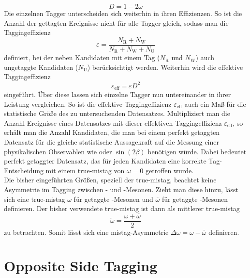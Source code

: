 \begin{equation}
D=1-2\omega
\end{equation}
Die einzelnen Tagger unterscheiden sich weiterhin in ihren Effizienzen. So ist die Anzahl der gettagten Ereignisse nicht für alle Tagger gleich, sodass  man die Taggingeffizienz
\begin{equation}
\varepsilon=\frac{N_{\text{R}}+N_{\text{W}}}{N_{\text{R}}+N_{\text{W}}+N_{\text{U}}}
\end{equation}
definiert, bei der neben Kandidaten mit einem Tag ($N_\text{R}$ und $N_\text{W}$) auch ungetaggte Kandidaten ($N_\text{U}$) berücksichtigt werden. Weiterhin wird die effektive Taggingeffizienz
\begin{equation}
\varepsilon_\text{eff}=\varepsilon D^2
\end{equation}
eingeführt. Über diese lassen sich einzelne Tagger nun untereinander in ihrer Leistung vergleichen. So ist die effektive Taggingeffizienz $\varepsilon_\text{eff}$ auch ein Maß für die statistische Größe des zu untersuchenden Datensatzes. Multipliziert man die Anzahl Ereignisse eines Datensatzes mit dieser effektiven Taggingeffizienz $\varepsilon_\text{eff}$, so erhält man die Anzahl Kandidaten, die man bei einem perfekt getaggten Datensatz für die gleiche statistische Aussagekraft auf die Messung einer physikalischen Observablen wie \dmd oder $\sin\left(2\beta\right)$ benötigen würde. Dabei bedeutet perfekt getaggter Datensatz, das für jeden Kandidaten eine korrekte Tag-Entscheidung mit einem true-mistag von $\omega=0$ getroffen wurde.\\
Die bisher eingeführten Größen, speziell der true-mistag, beachtet keine Asymmetrie im Tagging zwischen \Bz- und \Bzb-Mesonen. Zieht man diese hinzu, lässt sich eine true-mistag $\omega$ für getaggte \Bz-Mesonen und $\overline{\omega}$ für getaggte \Bzb-Mesonen definieren. Der bisher verwendete true-mistag ist dann als mittlerer true-mistag 
\begin{equation}
\widetilde{\omega}=\frac{\omega+\overline{\omega}}{2}
\end{equation}
zu betrachten. Somit lässt sich eine mistag-Asymmetrie $\Delta\omega=\omega-\overline{\omega}$ definieren.

\section{Opposite Side Tagging}\label{sec:ostagging}

